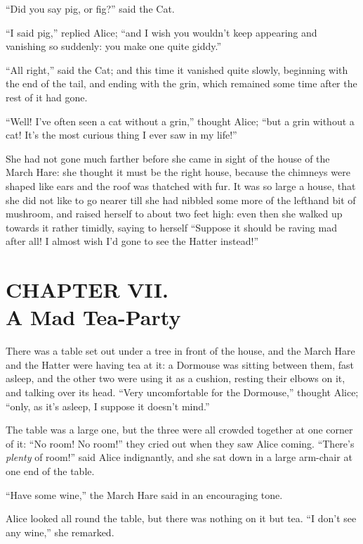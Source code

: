 \documentclass[11pt,openany,oneside]{book}
\begin{document}
“Did you say pig, or fig?” said the Cat. 

“I said pig,” replied Alice; “and I wish you wouldn’t keep appearing and vanishing so suddenly: you make one quite giddy.” 

“All right,” said the Cat; and this time it vanished quite slowly, beginning with the end of the tail, and ending with the grin, which remained some time after the rest of it had gone. 

“Well! I’ve often seen a cat without a grin,” thought Alice; “but a grin without a cat! It’s the most curious thing I ever saw in my life!” 

She had not gone much farther before she came in sight of the house of the March Hare: she thought it must be the right house, because the chimneys were shaped like ears and the roof was thatched with fur. It was so large a house, that she did not like to go nearer till she had nibbled some more of the lefthand bit of mushroom, and raised herself to about two feet high: even then she walked up towards it rather timidly, saying to herself “Suppose it should be raving mad after all! I almost wish I’d gone to see the Hatter instead!” 


\clearpage{}
{}
\chapter*{CHAPTER VII.\\  A Mad Tea-Party}
\leavevmode\hypertarget{d10.fp100315}{}There was a table set out under a tree in front of the house, and the March Hare and the Hatter were having tea at it: a Dormouse was sitting between them, fast asleep, and the other two were using it as a cushion, resting their elbows on it, and talking over its head. “Very uncomfortable for the Dormouse,” thought Alice; “only, as it’s asleep, I suppose it doesn’t mind.” 

The table was a large one, but the three were all crowded together at one corner of it: “No room! No room!” they cried out when they saw Alice coming. “There’s {\em plenty\/} of room!” said Alice indignantly, and she sat down in a large arm-chair at one end of the table. 

“Have some wine,” the March Hare said in an encouraging tone. 

Alice looked all round the table, but there was nothing on it but tea. “I don’t see any wine,” she remarked. 
\end{document}
